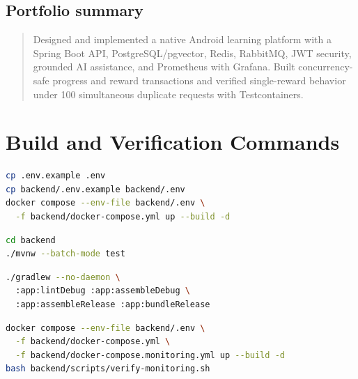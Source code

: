 \documentclass[12pt,a4paper,oneside]{report}
\begin{document}
\section{Portfolio summary}
\begin{quote}
Designed and implemented a native Android learning platform with a Spring Boot API,
PostgreSQL/pgvector, Redis, RabbitMQ, JWT security, grounded AI assistance, and
Prometheus with Grafana. Built concurrency-safe progress and reward
transactions and verified single-reward behavior under 100 simultaneous duplicate
requests with Testcontainers.
\end{quote}

\appendix
\chapter{Build and Verification Commands}
\begin{lstlisting}[language=bash,caption={Start the base environment}]
cp .env.example .env
cp backend/.env.example backend/.env
docker compose --env-file backend/.env \
  -f backend/docker-compose.yml up --build -d
\end{lstlisting}
\begin{lstlisting}[language=bash,caption={Run backend tests}]
cd backend
./mvnw --batch-mode test
\end{lstlisting}
\begin{lstlisting}[language=bash,caption={Run Android verification}]
./gradlew --no-daemon \
  :app:lintDebug :app:assembleDebug \
  :app:assembleRelease :app:bundleRelease
\end{lstlisting}
\begin{lstlisting}[language=bash,caption={Verify monitoring}]
docker compose --env-file backend/.env \
  -f backend/docker-compose.yml \
  -f backend/docker-compose.monitoring.yml up --build -d
bash backend/scripts/verify-monitoring.sh
\end{lstlisting}
\end{document}

